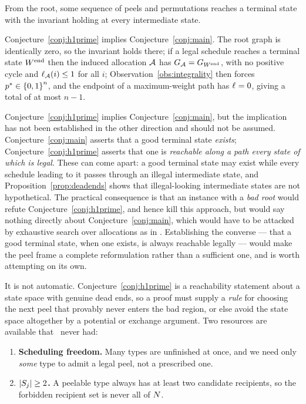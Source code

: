 \begin{conjecture}
\label{conj:h1prime}
From the root, some sequence of peels and permutations reaches a terminal state
with the invariant holding at every intermediate state.
\end{conjecture}

Conjecture~\ref{conj:h1prime} implies Conjecture~\ref{conj:main}. The root graph
is identically zero, so the invariant holds there; if a legal schedule reaches a
terminal state $W^{\mathrm{end}}$ then the induced allocation
$\mathcal{A}$ has $G_{\mathcal{A}} = G_{W^{\mathrm{end}}}$,
with no positive cycle and $\ell_{\mathcal{A}}(i) \le 1$ for all $i$;
Observation~\ref{obs:integrality} then forces $p^{*} \in \left\{0,1\right\}^n$, and
the endpoint of a maximum-weight path has $\ell_{} = 0$, giving a total of at
most $n-1$.

\begin{remark}
\label{rem:converse}
Conjecture~\ref{conj:h1prime} implies Conjecture~\ref{conj:main}, but the
implication has not been established in the other direction and should not be
assumed. Conjecture~\ref{conj:main} asserts that a good terminal state
\emph{exists}; Conjecture~\ref{conj:h1prime} asserts that one is \emph{reachable
along a path every state of which is legal}. These can come apart: a good
terminal state may exist while every schedule leading to it passes through an
illegal intermediate state, and Proposition~\ref{prop:deadends} shows that
illegal-looking intermediate states are not hypothetical. The practical
consequence is that an instance with a \emph{bad root} would refute
Conjecture~\ref{conj:h1prime}, and hence kill this approach, but would say
nothing directly about Conjecture~\ref{conj:main}, which would have to be
attacked by exhaustive search over allocations as in .
Establishing the converse --- that a good terminal state, when one exists, is
always reachable legally --- would make the peel frame a complete
reformulation rather than a sufficient one, and is worth attempting on its own.
\end{remark}

It is not automatic. Conjecture~\ref{conj:h1prime} is a reachability statement
about a state space with genuine dead ends, so a proof must supply a \emph{rule}
for choosing the next peel that provably never enters the bad region, or else
avoid the state space altogether by a potential or exchange argument. Two
resources are available that~\cite{BKNS22} never had:
\begin{enumerate}
  \item \textbf{Scheduling freedom.} Many types are unfinished at once, and we
    need only \emph{some} type to admit a legal peel, not a prescribed one.
  \item \textbf{$\left\lvert S_j\right\rvert \ge 2$.} A peelable type always has at least two
    candidate recipients, so the forbidden recipient set is never all of
    $N$.
\end{enumerate}

